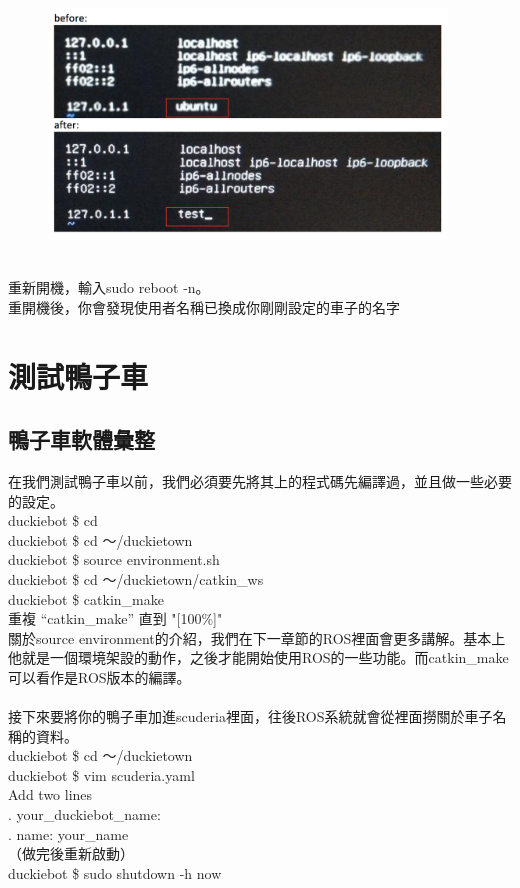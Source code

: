 \documentclass{article}
\begin{document}
\begin{figure}[htp]
    \begin{center}
        \includegraphics[width=300pt]{pic/1_3_3.png}
    \end{center}
\end{figure}
\\
重新開機，輸入sudo reboot -n。
\\重開機後，你會發現使用者名稱已換成你剛剛設定的車子的名字

\newpage
\section{測試鴨子車}
\subsection{鴨子車軟體彙整}
在我們測試鴨子車以前，我們必須要先將其上的程式碼先編譯過，並且做一些必要的設定。
\\duckiebot \$ cd 
\\duckiebot \$ cd ～/duckietown
\\duckiebot \$ source environment.sh
\\duckiebot \$ cd ～/duckietown/catkin\_ws
\\duckiebot \$ catkin\_make
\\重複 “catkin\_make” 直到 "[100\%]"
\\關於source environment的介紹，我們在下一章節的ROS裡面會更多講解。基本上他就是一個環境架設的動作，之後才能開始使用ROS的一些功能。而catkin\_make可以看作是ROS版本的編譯。
\\\\接下來要將你的鴨子車加進scuderia裡面，往後ROS系統就會從裡面撈關於車子名稱的資料。
\\duckiebot \$ cd ～/duckietown
\\duckiebot \$ vim scuderia.yaml
\\Add two lines
\\.   your\_duckiebot\_name:
\\.       name:  your\_name
\\（做完後重新啟動）
\\duckiebot \$ sudo shutdown -h now
\end{document}
